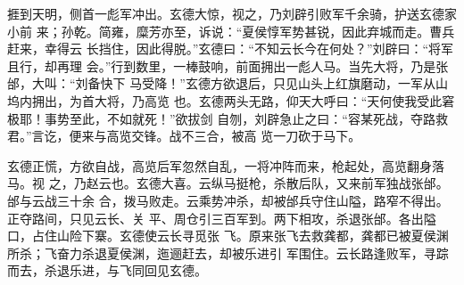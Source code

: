 捱到天明，侧首一彪军冲出。玄德大惊，视之，乃刘辟引败军千余骑，护送玄德家小前
来；孙乾。简雍，糜芳亦至，诉说：“夏侯惇军势甚锐，因此弃城而走。曹兵赶来，幸得云
长挡住，因此得脱。”玄德曰：“不知云长今在何处？”刘辟曰：“将军且行，却再理
会。”行到数里，一棒鼓响，前面拥出一彪人马。当先大将，乃是张邰，大叫：“刘备快下
马受降！”玄德方欲退后，只见山头上红旗磨动，一军从山坞内拥出，为首大将，乃高览
也。玄德两头无路，仰天大呼曰：“天何使我受此窘极耶！事势至此，不如就死！”欲拔剑
自刎，刘辟急止之曰：“容某死战，夺路救君。”言讫，便来与高览交锋。战不三合，被高
览一刀砍于马下。

玄德正慌，方欲自战，高览后军忽然自乱，一将冲阵而来，枪起处，高览翻身落马。视
之，乃赵云也。玄德大喜。云纵马挺枪，杀散后队，又来前军独战张邰。邰与云战三十余
合，拨马败走。云乘势冲杀，却被邰兵守住山隘，路窄不得出。正夺路间，只见云长、关
平、周仓引三百军到。两下相攻，杀退张邰。各出隘口，占住山险下寨。玄德使云长寻觅张
飞。原来张飞去救龚都，龚都已被夏侯渊所杀；飞奋力杀退夏侯渊，迤逦赶去，却被乐进引
军围住。云长路逢败军，寻踪而去，杀退乐进，与飞同回见玄德。

